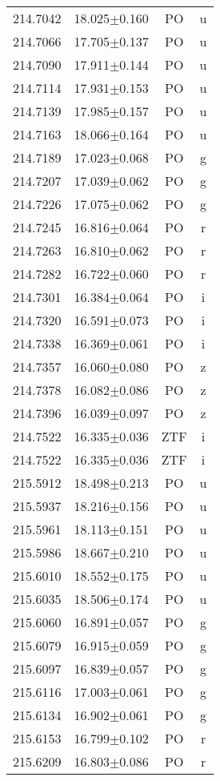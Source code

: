 \begin{table}
\begin{tabular}{cccc}
214.7042 & 18.025$\pm$0.160 & PO & u \\
214.7066 & 17.705$\pm$0.137 & PO & u \\
214.7090 & 17.911$\pm$0.144 & PO & u \\
214.7114 & 17.931$\pm$0.153 & PO & u \\
214.7139 & 17.985$\pm$0.157 & PO & u \\
214.7163 & 18.066$\pm$0.164 & PO & u \\
214.7189 & 17.023$\pm$0.068 & PO & g \\
214.7207 & 17.039$\pm$0.062 & PO & g \\
214.7226 & 17.075$\pm$0.062 & PO & g \\
214.7245 & 16.816$\pm$0.064 & PO & r \\
214.7263 & 16.810$\pm$0.062 & PO & r \\
214.7282 & 16.722$\pm$0.060 & PO & r \\
214.7301 & 16.384$\pm$0.064 & PO & i \\
214.7320 & 16.591$\pm$0.073 & PO & i \\
214.7338 & 16.369$\pm$0.061 & PO & i \\
214.7357 & 16.060$\pm$0.080 & PO & z \\
214.7378 & 16.082$\pm$0.086 & PO & z \\
214.7396 & 16.039$\pm$0.097 & PO & z \\
214.7522 & 16.335$\pm$0.036 & ZTF & i \\
214.7522 & 16.335$\pm$0.036 & ZTF & i \\
215.5912 & 18.498$\pm$0.213 & PO & u \\
215.5937 & 18.216$\pm$0.156 & PO & u \\
215.5961 & 18.113$\pm$0.151 & PO & u \\
215.5986 & 18.667$\pm$0.210 & PO & u \\
215.6010 & 18.552$\pm$0.175 & PO & u \\
215.6035 & 18.506$\pm$0.174 & PO & u \\
215.6060 & 16.891$\pm$0.057 & PO & g \\
215.6079 & 16.915$\pm$0.059 & PO & g \\
215.6097 & 16.839$\pm$0.057 & PO & g \\
215.6116 & 17.003$\pm$0.061 & PO & g \\
215.6134 & 16.902$\pm$0.061 & PO & g \\
215.6153 & 16.799$\pm$0.102 & PO & r \\
215.6209 & 16.803$\pm$0.086 & PO & r \\

\end{tabular}
\end{table}
